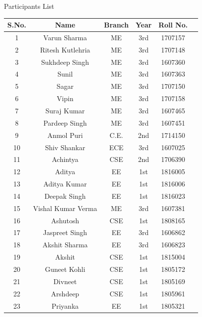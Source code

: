 \documentclass[12pt, a4 paper]{article}
\begin{document}
\begin{center}
\huge Participants List
\end{center}

\begin{table}[h!]
  \begin{center}
    \begin{tabular}{|c|c|c|c|c|c|} 
    \toprule %
      \textbf{S.No.} & \textbf{Name} & \textbf{Branch} & \textbf{Year} &\textbf{Roll No.} \\
\midrule %
1       &Varun Sharma   &ME     &3rd    &1707157\\
2       &Ritesh Kutlehria       &ME     &3rd    &1707148\\
3       &Sukhdeep Singh &ME     &3rd    &1607360\\
4       &Sunil  &ME     &3rd    &1607363\\
5       &Sagar  &ME     &3rd    &1707150\\
6       &Vipin  &ME     &3rd    &1707158\\
7       &Suraj Kumar    &ME     &3rd    &1607465\\
8       &Pardeep Singh  &ME     &3rd    &1607451\\
9       &Anmol Puri     &C.E.   &2nd    &1714150\\
10      &Shiv Shankar   &ECE    &3rd    &1607025\\
11      &Achintya       &CSE    &2nd    &1706390\\
12      &Aditya &EE     &1st    &1816005\\
13      &Aditya Kumar   &EE     &1st    &1816006\\
14      &Deepak Singh   &EE     &1st    &1816023\\
15      &Vishal Kumar Verma     &ME     &3rd    &1607381\\
16      &Ashutosh       &CSE    &1st    &1808165\\
17      &Jaspreet Singh &EE     &3rd    &1606862\\
18      &Akshit Sharma  &EE     &3rd    &1606823\\
19      &Akshit &CSE    &1st    &1815004\\
20      &Guneet Kohli   &CSE    &1st    &1805172\\
21      &Divneet        &CSE    &1st    &1805169\\
22      &Arshdeep       &CSE    &1st    &1805961\\
23      &Priyanka       &EE     &1st    &1805321\\

\end{tabular}
\end{center}
\end{table}
\end{document}
